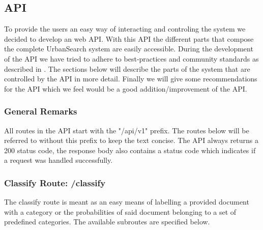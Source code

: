 \subsection{API}
To provide the users an easy way of interacting and controling the system we decided to develop an web API. With this API the different parts that compose the complete UrbanSearch system are easily accessible. During the development of the API we have tried to adhere to best-practices and community standards as described in \cite{apigee}. The sections below will describe the parts of the system that are controlled by the API in more detail. Finally we will give some recommendations for the API which we feel would be a good addition/improvement of the API.

\subsubsection{General Remarks}

All routes in the API start with the "/api/v1" prefix. The routes below will be referred to without this prefix to keep the text concise. The API always returns a 200 status code, the response body also contains a status code which indicates if a request was handled successfully.

\subsubsection{Classify Route: /classify}
The classify route is meant as an easy means of labelling a provided document with a category or the probabilities of said document belonging to a set of predefined categories.
The available subroutes are specified below.

